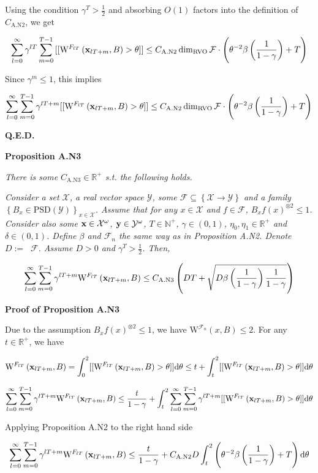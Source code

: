 \documentclass[a4paper]{article}
\newcommand{\Co}[1]{}
\newcommand{\AP}[1]{\left(#1\right)}
\newcommand{\AC}[1]{\left\{#1\right\}}
\newcommand{\D}{\mathrm{d}}
\newcommand{\Nats}{\mathbb{N}}
\newcommand{\Reals}{\mathbb{R}}
\newcommand{\PSD}{\mathrm{PSD}}
\newcommand{\B}{B}
\newcommand{\X}{\mathcal{X}}
\newcommand{\Y}{\mathcal{Y}}
\newcommand{\F}{\mathcal{F}}
\DeclareMathOperator{\RVO}{\dim_{RVO}}
\newcommand{\W}{\mathrm{W}}
\begin{document}
Using the condition $\gamma^T>\frac{1}{2}$ and absorbing $O(1)$ factors into the definition of $C_{\text{A.N2}}$, we get

$$\sum_{l=0}^{\infty}\gamma^{lT}\sum_{m=0}^{T-1}{[[\W^{F_{lT}}\AP{\bold{x}_{lT+m},\B}>\theta]]} \leq C_{\text{A.N2}}\RVO{\F}\cdot\AP{\theta^{-2}\beta\AP{\frac{1}{1-\gamma}}+T}$$

Since $\gamma^m\leq1$, this implies

$$\sum_{l=0}^\infty\sum_{m=0}^{T-1}{\gamma^{lT+m}[[\W^{F_{lT}}\AP{\bold{x}_{lT+m},B}>\theta]]} \leq C_{\mathrm{A.N2}}\RVO{\F}\cdot\AP{\theta^{-2}\beta\AP{\frac{1}{1-\gamma}}+T}$$

\textbf{Q.E.D.}\Co{b}

\textbf{Proposition A.N3}\Co{b}

\textit{There is some $C_{\mathrm{A.N3}}\in\Reals^+$ s.t. the following holds.}\Co{i}

\textit{Consider a set $\X$, a real vector space $\Y$, some $\F\subseteq\AC{\X\rightarrow\Y}$ and a family $\AC{\B _x\in\PSD(\Y)}_{x\in\X}$. Assume that for any $x\in\X$ and $f\in\F$, $\B _x{f(x)}^{\otimes2}\leq 1$. Consider also some $\bold{x}\in\X^\omega$, $\bold{y}\in\Y^\omega$, $T\in\Nats^+$, $\gamma\in(0,1)$, $\eta_0,\eta_1\in\Reals^+$ and $\delta\in(0,1)$. Define $\beta$ and $\F_n$ the same way as in Proposition A.N2. Denote $D:=\RVO{\F}$. Assume $D>0$ and $\gamma^T>\frac{1}{2}$. Then,}\Co{i}

$$\sum_{l=0}^\infty\sum_{m=0}^{T-1}{\gamma^{lT+m}\W^{F_{lT}}\AP{\bold{x}_{lT+m},B}} \leq C_{\mathrm{A.N3}}\AP{D T+\sqrt{D\beta\AP{\frac{1}{1-\gamma}}\frac{1}{1-\gamma}}}$$

\textbf{Proof of Proposition A.N3}\Co{b}

Due to the assumption $B_xf(x)^{\otimes2}\leq1$, we have $\W^{\F_n}(x,\B)\leq 2$. For any $t\in\Reals^+$, we have

$$\W^{F_{lT}}\AP{\bold{x}_{lT+m},B}=\int_0^2[[\W^{F_{lT}}\AP{\bold{x}_{lT+m},B}>\theta]]\D\theta\leq t+\int_t^2[[\W^{F_{lT}}\AP{\bold{x}_{lT+m},B}>\theta]]\D\theta$$

$$\sum_{l=0}^\infty\sum_{m=0}^{T-1}{\gamma^{lT+m}\W^{F_{lT}}\AP{\bold{x}_{lT+m},B}}\leq\frac{t}{1-\gamma}+\int_t^2 \sum_{l=0}^\infty\sum_{m=0}^{T-1}{\gamma^{lT+m}[[\W^{F_{lT}}\AP{\bold{x}_{lT+m},\B}>\theta]]}\D\theta$$

Applying Proposition A.N2 to the right hand side

$$\sum_{l=0}^\infty\sum_{m=0}^{T-1}{\gamma^{lT+m}\W^{F_{lT}}\AP{\bold{x}_{lT+m},B}}\leq\frac{t}{1-\gamma}+C_{\text{A.N2}}D\int_t^2 \AP{\theta^{-2}\beta\AP{\frac{1}{1-\gamma}}+T}\D\theta$$
\end{document}
